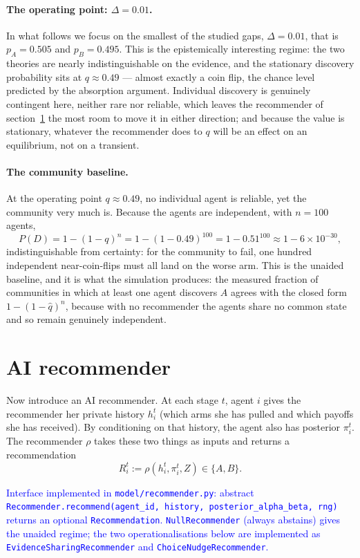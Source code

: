 \documentclass[12pt]{article}
\newcommand{\ignacio}[1]{\textcolor{blue}{#1}}
\begin{document}
\paragraph{The operating point: $\Delta = 0.01$.}
In what follows we focus on the smallest of the studied gaps, $\Delta = 0.01$, that is $p_A = 0.505$ and $p_B = 0.495$. This is the epistemically interesting regime: the two theories are nearly indistinguishable on the evidence, and the stationary discovery probability sits at $q \approx 0.49$ --- almost exactly a coin flip, the chance level predicted by the absorption argument. Individual discovery is genuinely contingent here, neither rare nor reliable, which leaves the recommender of section~\ref{sec:airec} the most room to move it in either direction; and because the value is stationary, whatever the recommender does to $q$ will be an effect on an equilibrium, not on a transient.

\paragraph{The community baseline.}
At the operating point $q \approx 0.49$, no individual agent is reliable, yet the community very much is. Because the agents are independent, with $n = 100$ agents,
\[
  P(D) = 1 - (1-q)^n = 1 - (1 - 0.49)^{100} = 1 - 0.51^{100} \approx 1 - 6 \times 10^{-30},
\]
indistinguishable from certainty: for the community to fail, one hundred independent near-coin-flips must all land on the worse arm. This is the unaided baseline, and it is what the simulation produces: the measured fraction of communities in which at least one agent discovers $A$ agrees with the closed form $1 - (1-\hat q)^n$, because with no recommender the agents share no common state and so remain genuinely independent.

\section{AI recommender}
\label{sec:airec}

Now introduce an AI recommender.
At each stage $t$, agent $i$ gives the recommender her private history $h_i^t$ (which arms she has pulled and which payoffs she has received).
By conditioning on that history, the agent also has posterior $\pi_i^t$.
The recommender $\rho$ takes these two things as inputs and returns a recommendation
\[
  R_i^t := \rho(h_i^t, \pi_i^t, Z) \in \{A, B\}.
\]

\ignacio{Interface implemented in \texttt{model/recommender.py}: abstract \texttt{Recommender.recommend(agent\_id, history, posterior\_alpha\_beta, rng)} returns an optional \texttt{Recommendation}. \texttt{NullRecommender} (always abstains) gives the unaided regime; the two operationalisations below are implemented as \texttt{EvidenceSharingRecommender} and \texttt{ChoiceNudgeRecommender}.}
\end{document}
